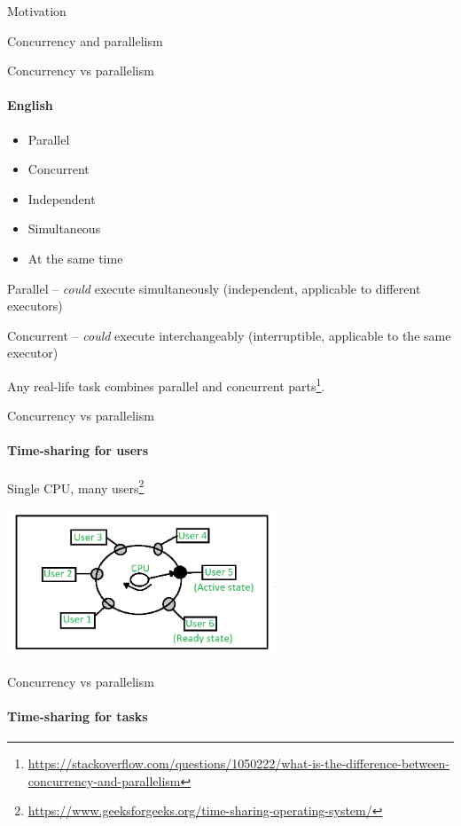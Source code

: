 \begin{section}{Motivation}
\begin{section}{Concurrency and parallelism}

\begin{frame}[t,noframenumbering]{Concurrency vs parallelism}
\framesubtitle{English}

\begin{itemize}
    \item Parallel
    \item Concurrent
    \item Independent
    \item Simultaneous
    \item At the same time
\end{itemize}

Parallel -- \textit{could} execute simultaneously (independent, applicable to different executors)

Concurrent -- \textit{could} execute interchangeably (interruptible, applicable to the same executor)

Any real-life task combines parallel and concurrent parts\footnote{\tiny\url{https://stackoverflow.com/questions/1050222/what-is-the-difference-between-concurrency-and-parallelism}}.

\end{frame}


\begin{frame}{Concurrency vs parallelism}
\framesubtitle{Time-sharing for users}

Single CPU, many users\footnote{\tiny\url{https://www.geeksforgeeks.org/time-sharing-operating-system/}}

\begin{center}
\includegraphics[width=0.6\textwidth]{./pics/time_sharing_one.png}
\end{center}

\end{frame}


\begin{frame}{Concurrency vs parallelism}
\framesubtitle{Time-sharing for tasks}


\end{frame}
\end{section}
\end{section}
